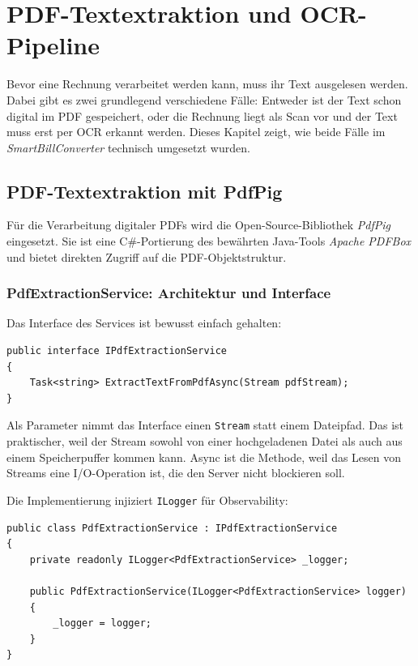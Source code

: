 \chapter{PDF-Textextraktion und OCR-Pipeline}
\label{chap:pdf_ocr_pipeline}

Bevor eine Rechnung verarbeitet werden kann, muss ihr Text ausgelesen werden. Dabei gibt es zwei grundlegend verschiedene Fälle: Entweder ist der Text schon digital im PDF gespeichert, oder die Rechnung liegt als Scan vor und der Text muss erst per OCR erkannt werden. Dieses Kapitel zeigt, wie beide Fälle im \textit{SmartBillConverter} technisch umgesetzt wurden.

\section{PDF-Textextraktion mit PdfPig}
\label{sec:pdf_extraction_implementation}

Für die Verarbeitung digitaler PDFs wird die Open-Source-Bibliothek \textit{PdfPig} eingesetzt. Sie ist eine C\#-Portierung des bewährten Java-Tools \textit{Apache PDFBox} und bietet direkten Zugriff auf die PDF-Objektstruktur.

\subsection{PdfExtractionService: Architektur und Interface}
\label{subsec:pdf_service_architecture}

Das Interface des Services ist bewusst einfach gehalten:

\begin{lstlisting}[language={[Sharp]C}, caption={IPdfExtractionService Interface}, label={lst:pdf_interface}]
public interface IPdfExtractionService
{
    Task<string> ExtractTextFromPdfAsync(Stream pdfStream);
}
\end{lstlisting}

Als Parameter nimmt das Interface einen \texttt{Stream} statt einem Dateipfad. Das ist praktischer, weil der Stream sowohl von einer hochgeladenen Datei als auch aus einem Speicherpuffer kommen kann. Async ist die Methode, weil das Lesen von Streams eine I/O-Operation ist, die den Server nicht blockieren soll.

Die Implementierung injiziert \texttt{ILogger} für Observability:

\begin{lstlisting}[language={[Sharp]C}, caption={PdfExtractionService Constructor}, label={lst:pdf_constructor}]
public class PdfExtractionService : IPdfExtractionService
{
    private readonly ILogger<PdfExtractionService> _logger;

    public PdfExtractionService(ILogger<PdfExtractionService> logger)
    {
        _logger = logger;
    }
}
\end{lstlisting}

